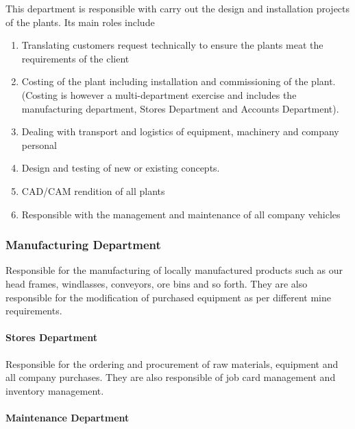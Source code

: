 \noindent This department is responsible with carry out the design and installation projects of the plants. Its main roles include\par

\begin{enumerate}
\item  Translating customers request technically to ensure the plants meat the requirements of the client

\item  Costing of the plant including installation and commissioning of the plant. (Costing is however a multi-department exercise and includes the manufacturing department, Stores Department and Accounts Department).

\item  Dealing with transport and logistics of equipment, machinery and company personal

\item  Design and testing of new or existing concepts. 

\item  CAD/CAM rendition of all plants

\item  Responsible with the management and maintenance of all company vehicles
\end{enumerate}


\subsubsection{  Manufacturing Department}

\noindent Responsible for the manufacturing of locally manufactured products such as our head frames, windlasses, conveyors, ore bins and so forth. They are also responsible for the modification of purchased equipment as per different mine requirements.


\paragraph{ Stores Department}

\noindent Responsible for the ordering and procurement of raw materials, equipment and all company purchases. They are also responsible of job card management and inventory management. 


\paragraph{ Maintenance Department}

